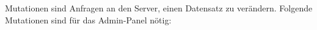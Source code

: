 Mutationen sind Anfragen an den Server, einen Datensatz zu verändern.
Folgende Mutationen sind für das Admin-Panel nötig: